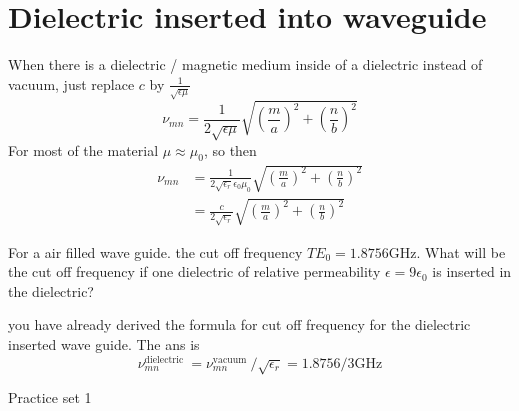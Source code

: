 \section{ Dielectric inserted into waveguide}
When there is a dielectric / magnetic medium inside of a dielectric instead of vacuum, just replace $c$ by $\frac{1}{\sqrt{\epsilon \mu}}$
$$\nu_{m n}=\frac{1}{2 \sqrt{\epsilon \mu}} \sqrt{\left(\frac{m}{a}\right)^{2}+\left(\frac{n}{b}\right)^{2}}$$
For most of the material $\mu \approx \mu_{0}$, so then
$$
\begin{aligned}
\nu_{m n} &=\frac{1}{2 \sqrt{\epsilon_{r}} \epsilon_{0} \mu_{0}} \sqrt{\left(\frac{m}{a}\right)^{2}+\left(\frac{n}{b}\right)^{2}} \\
&=\frac{c}{2 \sqrt{\epsilon_{r}}} \sqrt{\left(\frac{m}{a}\right)^{2}+\left(\frac{n}{b}\right)^{2}}
\end{aligned}
$$
\begin{exercise}
 For a air filled wave guide. the cut off frequency $T E_{0}=1.8756 \mathrm{GHz}$. What will be the cut off frequency if one dielectric of relative permeability $\epsilon=9 \epsilon_{0}$ is inserted in the dielectric?
\end{exercise}
\begin{answer}
 you have already derived the formula for cut off frequency for the dielectric inserted wave guide. The ans is
$$
\nu_{m n}^{\text {dielectric }}=\nu_{m n}^{\text {vacuum }} / \sqrt{\epsilon_{r}}=1.8756 / 3 \mathrm{GHz}
$$	
\end{answer}
\newpage
\begin{abox}
	Practice set 1
	\end{abox}
